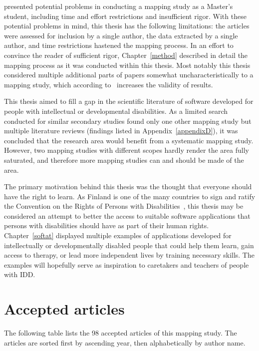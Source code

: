 \documentclass[utf8,english]{gradu3}
\begin{document}
\textcite{kitchenham2011} presented potential problems in conducting a mapping study
as a Master's student, including time and effort restrictions and insufficient rigor.
With these potential problems in mind, this thesis has the following limitations:
the articles were assessed for inclusion by a single author,
the data extracted by a single author,
and time restrictions hastened the mapping process.
In an effort to convince the reader of sufficient rigor,
Chapter~\ref{method} described in detail the mapping process as it was
conducted within this thesis.
Most notably this thesis considered multiple additional parts of papers somewhat
uncharacteristically to a mapping study, which according to~\textcite{petersen2008}
increases the validity of results.

This thesis aimed to fill a gap in the scientific literature of software developed for
people with intellectual or developmental disabilities.
As a limited search conducted for similar secondary studies found only
one other mapping study but multiple literature reviews
(findings listed in Appendix~\ref{appendixD}),
it was concluded that the research area would benefit from a systematic mapping study.
However, two mapping studies with different scopes hardly
render the area fully saturated, and therefore more mapping studies
can and should be made of the area.

The primary motivation behind this thesis was the thought
that everyone should have the right to learn.
As Finland is one of the many countries to sign and ratify the
Convention on the Rights of Persons with Disabilities~\parencite{unitednations},
this thesis may be considered an attempt to better the access to suitable
software applications that persons with disabilities should have
as part of their human rights.
Chapter~\ref{softat} displayed multiple examples of applications
developed for intellectually or developmentally disabled people that could help them learn,
gain access to therapy, or lead more independent lives by training necessary skills.
The examples will hopefully serve as inspiration to caretakers and teachers of people with IDD.


\printbibliography %

\appendix
\section{Accepted articles} \label{appendixA}

\begin{footnotesize}
  The following table lists the 98 accepted articles of this mapping study.
  The articles are sorted first by ascending year, then alphabetically by author name.
\end{footnotesize}
\end{document}

